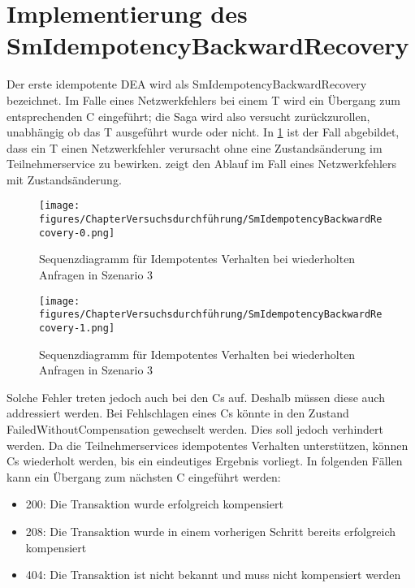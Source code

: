 \section{Implementierung des SmIdempotencyBackwardRecovery}
Der erste idempotente DEA wird als SmIdempotencyBackwardRecovery bezeichnet. Im Falle eines Netzwerkfehlers bei einem T wird ein Übergang zum entsprechenden C eingeführt; die Saga wird also versucht zurückzurollen, unabhängig ob das T ausgeführt wurde oder nicht. In \cref{fig:fig_sm_idempotency_backward_recovery_testcase2} ist der Fall abgebildet, dass ein T einen Netzwerkfehler verursacht ohne eine Zustandsänderung im Teilnehmerservice zu bewirken.  zeigt den Ablauf im Fall eines Netzwerkfehlers mit Zustandsänderung. 

\begin{figure}[h!]
	\centering
	\texttt{[image: figures/ChapterVersuchsdurchführung/SmIdempotencyBackwardRecovery-0.png]}
	\caption{Sequenzdiagramm für Idempotentes Verhalten bei wiederholten Anfragen in Szenario 3}
	\label{fig:fig_sm_idempotency_backward_recovery_testcase2}
\end{figure}

\FloatBarrier
\begin{figure}[h!]
	\centering
	\texttt{[image: figures/ChapterVersuchsdurchführung/SmIdempotencyBackwardRecovery-1.png]}
	\caption{Sequenzdiagramm für Idempotentes Verhalten bei wiederholten Anfragen in Szenario 3}
	\label{fig:fig_sm_idempotency_backward_recovery_testcase3}
\end{figure}
\FloatBarrier

Solche Fehler treten jedoch auch bei den Cs auf. Deshalb müssen diese auch addressiert werden. Bei Fehlschlagen eines Cs könnte in den Zustand FailedWithoutCompensation gewechselt werden. Dies soll jedoch verhindert werden. Da die Teilnehmerservices idempotentes Verhalten unterstützen, können Cs wiederholt werden, bis ein eindeutiges Ergebnis vorliegt. In folgenden Fällen kann ein Übergang zum nächsten C eingeführt werden:
\begin{itemize}
	\item 200: Die Transaktion wurde erfolgreich kompensiert
	\item 208: Die Transaktion wurde in einem vorherigen Schritt bereits erfolgreich kompensiert
	\item 404: Die Transaktion ist nicht bekannt und muss nicht kompensiert werden
\end{itemize}

